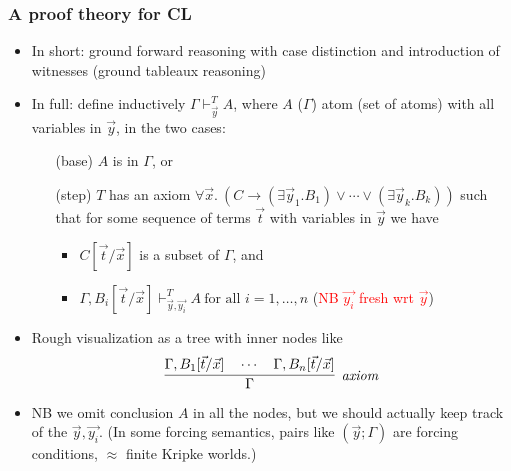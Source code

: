\documentclass[handout,11pt,hyperref ={colorlinks = true, urlcolor = red}]{beamer}
\newcommand{\red}[1]{\textcolor{red}{#1}}
\begin{document}
\begin{frame}
\frametitle{A proof theory for CL}
 \begin{itemize}[<+->]   %
    \item In short: ground forward reasoning with case distinction and
    introduction of witnesses (ground tableaux reasoning)
    \item In full: define inductively $\Gamma\vdash_{\vec{y}}^T A$, where 
    $A$ ($\Gamma$) atom (set of atoms) with all variables in $\vec{y}$, 
    in the two cases:
    \begin{enumerate}
    \item[(base)] $A$ is in $\Gamma$, or 
    \item[(step)] $T$ has an axiom $\forall\vec{x}.~
    (C \to (\exists\vec{y}_1.B_1) \lor \cdots \lor (\exists\vec{y}_k.B_k))$
    such that for some sequence of terms $\vec{t}$ with variables in $\vec{y}$
    we have
    \begin{itemize}
    \item $C[\vec{t}/\vec{x}]$ is a subset of $\Gamma$, and
    \item $\Gamma,B_i[\vec{t}/\vec{x}]\vdash^T_{\vec{y},\vec{y_i}} A
          ~\text{for all $i = 1,\dots,n$}$ \quad
          (\red{NB $\vec{y_i}$ fresh wrt $\vec{y}$})
    \end{itemize}
    \end{enumerate}
    \item Rough visualization as a tree with inner nodes like 
    \[
\infer[\mathit{axiom}]{\Gamma}{\Gamma,B_1[\vec{t}/\vec{x}] \quad\cdots\quad \Gamma,B_n[\vec{t}/\vec{x}]}
    \]
    \item NB we omit conclusion $A$ in all the nodes, 
    but we should actually keep track of the $\vec{y},\vec{y_i}$.
    (In some forcing semantics, pairs like $(\vec{y};\Gamma)$
    are forcing conditions, $\approx$ finite Kripke worlds.)
 \end{itemize}
\end{frame}
\end{document}
